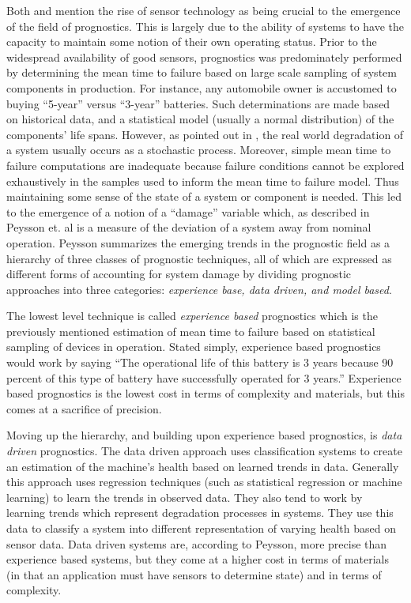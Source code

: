 \documentclass[12pt]{article}
\begin{document}
Both \cite{877920} and \cite{4585821} mention the rise of sensor technology as
being crucial to the emergence of the field of prognostics.  This is largely
due to the ability of systems to have the capacity to maintain some notion of
their own operating status.  Prior to the widespread availability of good sensors,
prognostics was predominately performed by determining the mean time to failure
based on large scale sampling of system components in production.  For
instance, any automobile owner is accustomed to buying ``5-year'' versus
``3-year'' batteries.  Such determinations are made based on historical data,
and a statistical model (usually a normal distribution) of the components' life spans.
However, as pointed out in \cite{4711428}, the real world degradation of a
system usually occurs as a stochastic process.
Moreover, simple mean time to failure
computations are inadequate because failure conditions cannot be explored
exhaustively in the samples used to inform the mean time to failure model.  Thus
maintaining some sense of the state of a system or component is needed.  This
led to the emergence of a notion of a ``damage'' variable which, as described
in Peysson et. al \cite{4711428} is a measure of the deviation of a system away
from nominal operation.  Peysson summarizes the emerging trends in the
prognostic field as a hierarchy of three classes of prognostic techniques, all
of which are expressed as different forms of accounting for system damage by
dividing prognostic approaches into three categories: {\em experience base,
  data driven, and model based}.  

The lowest level technique is called {\em experience based} prognostics which
is the previously mentioned estimation of mean time to failure based on
statistical sampling of devices in operation.  Stated simply, experience based
prognostics would work by saying ``The operational life of this battery is 3
years because 90 percent of this type of battery have successfully operated for
3 years.''  Experience based prognostics is the lowest cost in terms of
complexity and materials, but this comes at a sacrifice of precision.  

Moving up the hierarchy, and building upon experience based
prognostics, is {\em data driven} prognostics.  The data driven
approach uses classification systems to create an estimation of the
machine's health based on learned trends in data.  Generally this
approach uses regression techniques (such as statistical regression or
machine learning) to learn the trends in observed data.  They also
tend to work by learning trends which represent degradation processes
in systems.  They use this data to classify a system into different
representation of varying health based on sensor data.  Data driven
systems are, according to Peysson, more precise than experience based
systems, but they come at a higher cost in terms of materials (in that
an application must have sensors to determine state) and in terms of
complexity.
\end{document}
